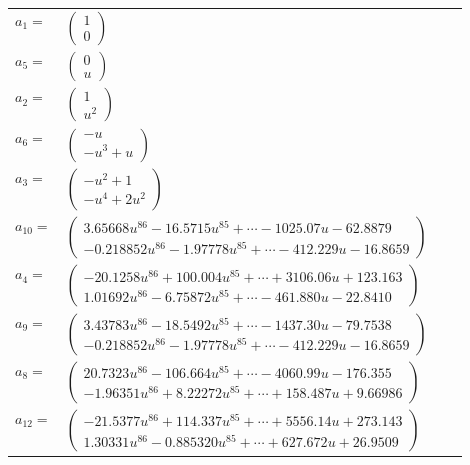 \documentclass[1p]{elsarticle_modified}
\theoremstyle{definition}
\begin{document}
\begin{tabular}{m{7pt} m{180pt} m{7pt} m{180pt} }
\flushright $a_{1}=$&$\begin{pmatrix}1\\0\end{pmatrix}$ \\
\flushright $a_{5}=$&$\begin{pmatrix}0\\u\end{pmatrix}$ \\
\flushright $a_{2}=$&$\begin{pmatrix}1\\u^2\end{pmatrix}$ \\
\flushright $a_{6}=$&$\begin{pmatrix}- u\\- u^3+u\end{pmatrix}$ \\
\flushright $a_{3}=$&$\begin{pmatrix}- u^2+1\\- u^4+2 u^2\end{pmatrix}$ \\
\flushright $a_{10}=$&$\begin{pmatrix}3.65668 u^{86}-16.5715 u^{85}+\cdots-1025.07 u-62.8879\\-0.218852 u^{86}-1.97778 u^{85}+\cdots-412.229 u-16.8659\end{pmatrix}$ \\
\flushright $a_{4}=$&$\begin{pmatrix}-20.1258 u^{86}+100.004 u^{85}+\cdots+3106.06 u+123.163\\1.01692 u^{86}-6.75872 u^{85}+\cdots-461.880 u-22.8410\end{pmatrix}$ \\
\flushright $a_{9}=$&$\begin{pmatrix}3.43783 u^{86}-18.5492 u^{85}+\cdots-1437.30 u-79.7538\\-0.218852 u^{86}-1.97778 u^{85}+\cdots-412.229 u-16.8659\end{pmatrix}$ \\
\flushright $a_{8}=$&$\begin{pmatrix}20.7323 u^{86}-106.664 u^{85}+\cdots-4060.99 u-176.355\\-1.96351 u^{86}+8.22272 u^{85}+\cdots+158.487 u+9.66986\end{pmatrix}$ \\
\flushright $a_{12}=$&$\begin{pmatrix}-21.5377 u^{86}+114.337 u^{85}+\cdots+5556.14 u+273.143\\1.30331 u^{86}-0.885320 u^{85}+\cdots+627.672 u+26.9509\end{pmatrix}$ \\

\end{tabular}
\end{document}
